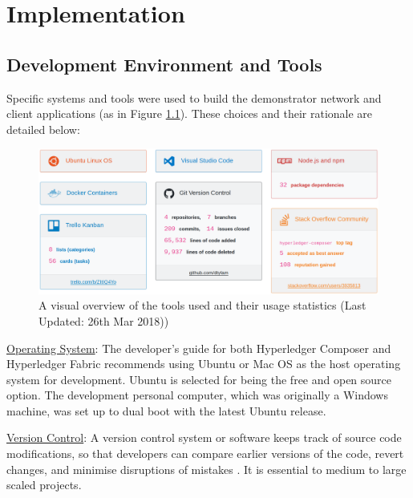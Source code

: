 \chapter{Implementation}

\graphicspath{{Chapter6/Figs/Raster/}{Chapter6/Figs/}}

\section{Development Environment and Tools}

Specific systems and tools were used to build the demonstrator network and client applications (as in Figure \ref{fig:platform_stats}).
These choices and their rationale are detailed below:

\begin{figure}[!ht]
	\centering
	\includegraphics[width=1.0\textwidth]{platform_stats}
	\caption[Development Tools and Usage Statistics]
	{A visual overview of the tools used and their usage statistics (Last Updated: 26th Mar 2018))}
	\label{fig:platform_stats}
\end{figure}

\underline{Operating System}: The developer's guide for both Hyperledger Composer and Hyperledger Fabric
recommends using Ubuntu or Mac OS as the host operating system for development.
Ubuntu is selected for being the free and open source option. The development personal computer, which was originally
a Windows machine, was set up to dual boot with the latest Ubuntu release.

\underline{Version Control}: A version control system or software keeps track of source code modifications,
so that developers can compare earlier versions of the code, revert changes, and
minimise disruptions of mistakes \citep{atlassian2018vcs}. It is essential to medium to large scaled projects.


